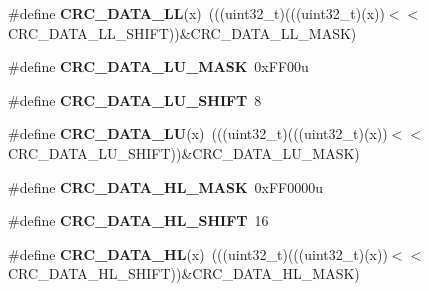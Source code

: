 \begin{DoxyCompactItemize}
\item 
\#define {\bfseries C\+R\+C\+\_\+\+D\+A\+T\+A\+\_\+\+LL}(x)~(((uint32\+\_\+t)(((uint32\+\_\+t)(x))$<$$<$C\+R\+C\+\_\+\+D\+A\+T\+A\+\_\+\+L\+L\+\_\+\+S\+H\+I\+FT))\&C\+R\+C\+\_\+\+D\+A\+T\+A\+\_\+\+L\+L\+\_\+\+M\+A\+SK)\hypertarget{group__CRC__Register__Masks_ga5c2d2d988b40b375080e1e6e63ba3f77}{}\label{group__CRC__Register__Masks_ga5c2d2d988b40b375080e1e6e63ba3f77}

\item 
\#define {\bfseries C\+R\+C\+\_\+\+D\+A\+T\+A\+\_\+\+L\+U\+\_\+\+M\+A\+SK}~0x\+F\+F00u\hypertarget{group__CRC__Register__Masks_ga270ddfffb4376c63d7dcb6c67ec26ac0}{}\label{group__CRC__Register__Masks_ga270ddfffb4376c63d7dcb6c67ec26ac0}

\item 
\#define {\bfseries C\+R\+C\+\_\+\+D\+A\+T\+A\+\_\+\+L\+U\+\_\+\+S\+H\+I\+FT}~8\hypertarget{group__CRC__Register__Masks_ga1ff4f24e49d987429fc4bf9515a37d40}{}\label{group__CRC__Register__Masks_ga1ff4f24e49d987429fc4bf9515a37d40}

\item 
\#define {\bfseries C\+R\+C\+\_\+\+D\+A\+T\+A\+\_\+\+LU}(x)~(((uint32\+\_\+t)(((uint32\+\_\+t)(x))$<$$<$C\+R\+C\+\_\+\+D\+A\+T\+A\+\_\+\+L\+U\+\_\+\+S\+H\+I\+FT))\&C\+R\+C\+\_\+\+D\+A\+T\+A\+\_\+\+L\+U\+\_\+\+M\+A\+SK)\hypertarget{group__CRC__Register__Masks_ga567014ec3cf8760d4e4502866c31ef00}{}\label{group__CRC__Register__Masks_ga567014ec3cf8760d4e4502866c31ef00}

\item 
\#define {\bfseries C\+R\+C\+\_\+\+D\+A\+T\+A\+\_\+\+H\+L\+\_\+\+M\+A\+SK}~0x\+F\+F0000u\hypertarget{group__CRC__Register__Masks_ga4d36f0e2640b258579276ada9dbc68b1}{}\label{group__CRC__Register__Masks_ga4d36f0e2640b258579276ada9dbc68b1}

\item 
\#define {\bfseries C\+R\+C\+\_\+\+D\+A\+T\+A\+\_\+\+H\+L\+\_\+\+S\+H\+I\+FT}~16\hypertarget{group__CRC__Register__Masks_gae717e6022d6dd5e4e72cc3386e7ccc6b}{}\label{group__CRC__Register__Masks_gae717e6022d6dd5e4e72cc3386e7ccc6b}

\item 
\#define {\bfseries C\+R\+C\+\_\+\+D\+A\+T\+A\+\_\+\+HL}(x)~(((uint32\+\_\+t)(((uint32\+\_\+t)(x))$<$$<$C\+R\+C\+\_\+\+D\+A\+T\+A\+\_\+\+H\+L\+\_\+\+S\+H\+I\+FT))\&C\+R\+C\+\_\+\+D\+A\+T\+A\+\_\+\+H\+L\+\_\+\+M\+A\+SK)\hypertarget{group__CRC__Register__Masks_gab48aad72696d318bf010c7e0c54cc95b}{}\label{group__CRC__Register__Masks_gab48aad72696d318bf010c7e0c54cc95b}


\end{DoxyCompactItemize}
